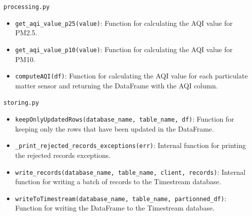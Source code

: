 \documentclass[12pt,oneside]{book} %
\begin{document}
\begin{subappendices}
\begin{description}
        \item \texttt{processing.py}
              \begin{itemize}
                  \item \texttt{get\_aqi\_value\_p25(value)}: Function for calculating the AQI value for PM2.5.
                  \item \texttt{get\_aqi\_value\_p10(value)}: Function for calculating the AQI value for PM10.
                  \item \texttt{computeAQI(df)}: Function for calculating the AQI value for each particulate matter sensor and returning the DataFrame with the AQI column.
              \end{itemize}

        \item \texttt{storing.py}
              \begin{itemize}
                  \item \texttt{keepOnlyUpdatedRows(database\_name, table\_name, df)}: Function for keeping only the rows that have been updated in the DataFrame.
                  \item \texttt{\_print\_rejected\_records\_exceptions(err)}: Internal function for printing the rejected records exceptions.
                  \item \texttt{write\_records(database\_name, table\_name, client, records)}: Internal function for writing a batch of records to the Timestream database.
                  \item \texttt{writeToTimestream(database\_name, table\_name, partionned\_df)}: Function for writing the DataFrame to the Timestream database.
              \end{itemize}
    \end{description}
\end{subappendices}
\end{document}
